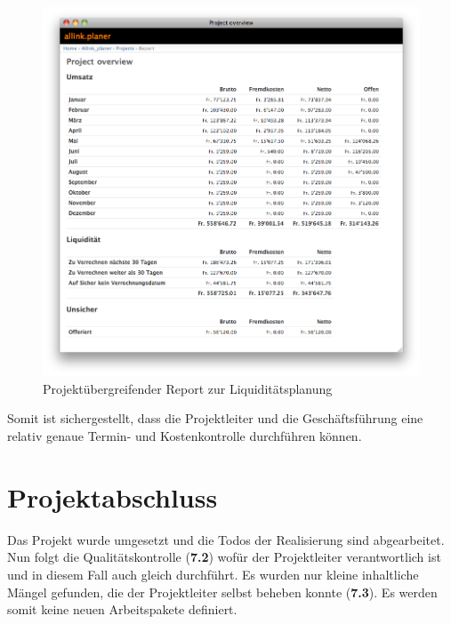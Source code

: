 \begin{figure}[htbp]
\begin{center}
\includegraphics[width=1.0\textwidth,angle=0]{./bilder/proof_of_concept/allink_planer_liq.png}
\caption[Projektübergreifender Report zur Liquiditätsplanung]{Projektübergreifender 
    Report zur Liquiditätsplanung\footnotemark}
\label{pic:allink_planer_liq}
\end{center}
\end{figure}

Somit ist sichergestellt, dass die Projektleiter und die Geschäftsführung eine
relativ genaue Termin- und Kostenkontrolle durchführen können.

\section{Projektabschluss}
Das Projekt wurde umgesetzt und die Todos der Realisierung sind abgearbeitet.
Nun folgt die Qualitätskontrolle (\textbf{7.2}) wofür der Projektleiter
verantwortlich ist und in diesem Fall auch gleich durchführt. Es wurden nur
kleine inhaltliche Mängel gefunden, die der Projektleiter selbst beheben
konnte (\textbf{7.3}). Es werden somit keine neuen Arbeitspakete definiert.


